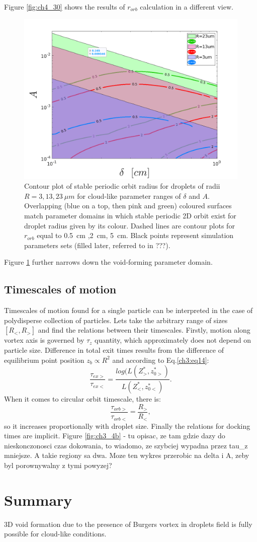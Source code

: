 \documentclass[../main.tex]{subfiles}
\begin{document}
Figure \ref{fig:ch4_30} shows the results of $r_{orb}$ calculation in a different view. 
\begin{figure}
\centering
\noindent \includegraphics[width=30pc]{gfx/void_radii_R_3_13_23.png}
\caption{Contour plot of stable periodic orbit radius for droplets of radii $R=3,13,23 \ \mu m$ for cloud-like parameter ranges of $\delta$ and $A$. Overlapping (blue on a top, then pink and green) coloured surfaces match parameter domains in which stable periodic 2D orbit exist for droplet radius given by its colour. Dashed lines are contour plots for $r_{orb}$ equal to 0.5~cm ,2~cm, 5~cm. Black points represent simulation parameters sets (filled later, referred to in ???).}
\label{fig:ch4_7}
\end{figure}

Figure \ref{fig:ch4_7} further narrows down the void-forming parameter domain.

\subsection{Timescales of motion}
Timescales of motion found for a single particle can be interpreted in the case of polydisperse collection of particles. Lets take the arbitrary range of sizes $[R_<,R_>]$ and find the relations between their timescales. Firstly, motion along vortex axis is governed by $\tau_z$ quantity, which approximately does not depend on particle size. Difference in total exit times results from the difference of equilibrium point position $z_b \propto R^2$ and according to Eq.\ref{ch3:eq14}:
\begin{equation}
\frac{\tau_{ex >}}{\tau_{ex <}}=\frac{log(L(Z^*_>,z_{0 >}^*)}{L(Z^*_<,z_{0 <}^*)}.
\label{ch4:eq1}
\end{equation}
When it comes to circular orbit timescale, there is:
\begin{equation}
\frac{\tau_{orb >}}{\tau_{orb <}}=\frac{R_>}{R_<},
\label{ch4:eq2}
\end{equation}
so it increases proportionally with droplet size. Finally the relations for docking times are implicit. Figure \autoref{fig:ch3_4b} - tu opisac, ze tam gdzie dazy do nieskonczonosci czas dokowania, to wiadomo, ze szybciej wypadna przez tau_z mniejsze. A takie regiony sa dwa. Moze ten wykres przerobic na delta i A, zeby byl porownywalny z tymi powyzej?
\section{Summary}
3D void formation due to the presence of Burgers vortex in droplets field is fully possible for cloud-like conditions.
\end{document}
